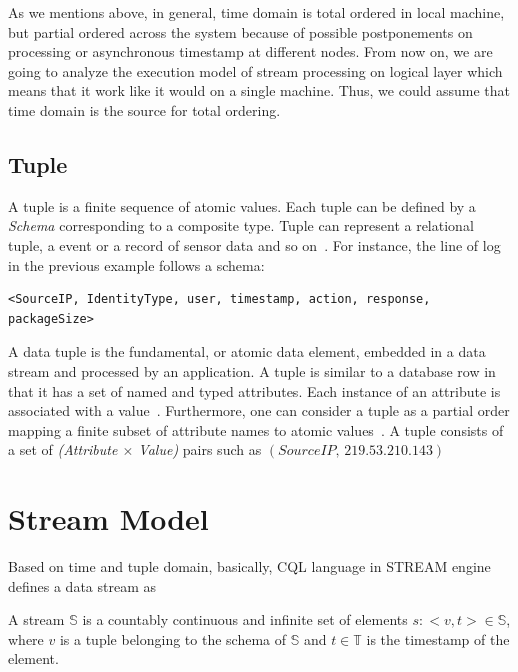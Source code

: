 As we mentions above, in general, time domain is total ordered in local machine, but partial ordered across the system because of possible postponements on processing or asynchronous timestamp at different nodes. From now on, we are going to analyze the execution model of stream processing on logical layer which means that it work like it would on a single machine. Thus, we could assume that time domain is the source for total ordering.


\subsection*{Tuple}
A tuple is a finite sequence of atomic values. Each tuple can be defined by a \textit{Schema} corresponding to a composite type. Tuple can represent a relational tuple, a event or a record of sensor data and so on~\citep{Arasu:2006}. For instance, the line of log in the previous example follows a schema:

\begin{verbatim}
<SourceIP, IdentityType, user, timestamp, action, response, packageSize>
\end{verbatim}

A data tuple is the fundamental, or atomic data element, embedded in a data stream and processed by an application. A tuple is similar to a database row in that it has a set of named and typed attributes. Each instance of an attribute is associated with a value~\citep{Henrique:2014}. Furthermore, one can consider a tuple as a partial order mapping a finite subset of attribute names to atomic values~\citep{Petit:2012}. A tuple consists of a set of \textit{(Attribute $\times$ Value)} pairs such as $(SourceIP,\,219.53.210.143)$


\section{Stream Model}


Based on time and tuple domain, basically, CQL language in STREAM engine~\citep{Arasu:2006} defines a data stream as
\begin{defi}
	A stream $\mathbb{S}$ is a countably continuous and infinite set of elements $s:<v,t> \in \mathbb{S}$, where $v$ is a tuple belonging to the schema of $\mathbb{S}$ and $t \in \mathbb{T}$ is the timestamp of the element. 
\end{defi}

